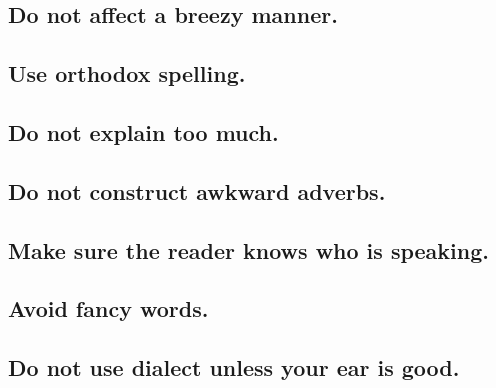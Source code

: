 \documentclass{article}
\numberwithin{equation}{section}
\begin{document}

\subsection{Do not affect a breezy manner.}


\subsection{Use orthodox spelling.}


\subsection{Do not explain too much.}


\subsection{Do not construct awkward adverbs.}


\subsection{Make sure the reader knows who is speaking.}


\subsection{Avoid fancy words.}


\subsection{Do not use dialect unless your ear is good.}

\end{document}
